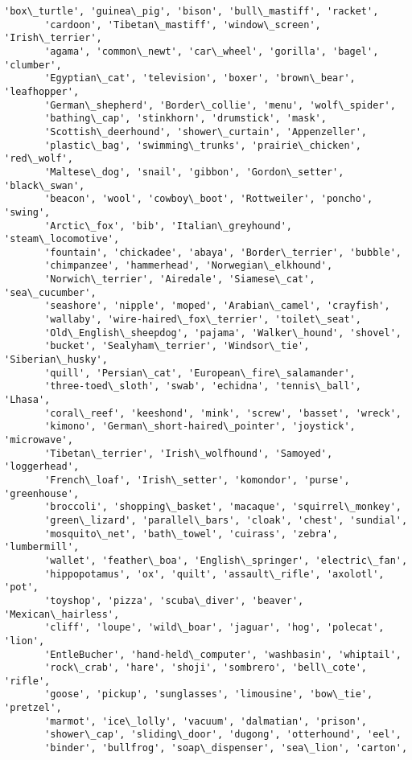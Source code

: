 \documentclass[11pt]{article}
\begin{document}
\begin{tcolorbox}[breakable, size=fbox, boxrule=.5pt, pad at break*=1mm, opacityfill=0]
\begin{Verbatim}[commandchars=\\\{\}]
       'box\_turtle', 'guinea\_pig', 'bison', 'bull\_mastiff', 'racket',
       'cardoon', 'Tibetan\_mastiff', 'window\_screen', 'Irish\_terrier',
       'agama', 'common\_newt', 'car\_wheel', 'gorilla', 'bagel', 'clumber',
       'Egyptian\_cat', 'television', 'boxer', 'brown\_bear', 'leafhopper',
       'German\_shepherd', 'Border\_collie', 'menu', 'wolf\_spider',
       'bathing\_cap', 'stinkhorn', 'drumstick', 'mask',
       'Scottish\_deerhound', 'shower\_curtain', 'Appenzeller',
       'plastic\_bag', 'swimming\_trunks', 'prairie\_chicken', 'red\_wolf',
       'Maltese\_dog', 'snail', 'gibbon', 'Gordon\_setter', 'black\_swan',
       'beacon', 'wool', 'cowboy\_boot', 'Rottweiler', 'poncho', 'swing',
       'Arctic\_fox', 'bib', 'Italian\_greyhound', 'steam\_locomotive',
       'fountain', 'chickadee', 'abaya', 'Border\_terrier', 'bubble',
       'chimpanzee', 'hammerhead', 'Norwegian\_elkhound',
       'Norwich\_terrier', 'Airedale', 'Siamese\_cat', 'sea\_cucumber',
       'seashore', 'nipple', 'moped', 'Arabian\_camel', 'crayfish',
       'wallaby', 'wire-haired\_fox\_terrier', 'toilet\_seat',
       'Old\_English\_sheepdog', 'pajama', 'Walker\_hound', 'shovel',
       'bucket', 'Sealyham\_terrier', 'Windsor\_tie', 'Siberian\_husky',
       'quill', 'Persian\_cat', 'European\_fire\_salamander',
       'three-toed\_sloth', 'swab', 'echidna', 'tennis\_ball', 'Lhasa',
       'coral\_reef', 'keeshond', 'mink', 'screw', 'basset', 'wreck',
       'kimono', 'German\_short-haired\_pointer', 'joystick', 'microwave',
       'Tibetan\_terrier', 'Irish\_wolfhound', 'Samoyed', 'loggerhead',
       'French\_loaf', 'Irish\_setter', 'komondor', 'purse', 'greenhouse',
       'broccoli', 'shopping\_basket', 'macaque', 'squirrel\_monkey',
       'green\_lizard', 'parallel\_bars', 'cloak', 'chest', 'sundial',
       'mosquito\_net', 'bath\_towel', 'cuirass', 'zebra', 'lumbermill',
       'wallet', 'feather\_boa', 'English\_springer', 'electric\_fan',
       'hippopotamus', 'ox', 'quilt', 'assault\_rifle', 'axolotl', 'pot',
       'toyshop', 'pizza', 'scuba\_diver', 'beaver', 'Mexican\_hairless',
       'cliff', 'loupe', 'wild\_boar', 'jaguar', 'hog', 'polecat', 'lion',
       'EntleBucher', 'hand-held\_computer', 'washbasin', 'whiptail',
       'rock\_crab', 'hare', 'shoji', 'sombrero', 'bell\_cote', 'rifle',
       'goose', 'pickup', 'sunglasses', 'limousine', 'bow\_tie', 'pretzel',
       'marmot', 'ice\_lolly', 'vacuum', 'dalmatian', 'prison',
       'shower\_cap', 'sliding\_door', 'dugong', 'otterhound', 'eel',
       'binder', 'bullfrog', 'soap\_dispenser', 'sea\_lion', 'carton',

\end{Verbatim}
\end{tcolorbox}
\end{document}
